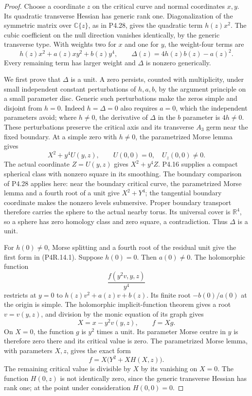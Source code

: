 \begin{proof}
Choose a coordinate $z$ on the critical curve and normal
coordinates $x,y$. Its quadratic transverse Hessian has generic
rank one. Diagonalization of the symmetric matrix over
$\mathbb C\{z\}$, as in P4.28, gives the quadratic term
$h(z)x^2$. The cubic coefficient on the null direction
vanishes identically, by the generic transverse type. With
weights two for $x$ and one for $y$, the weight-four terms are
\[
 h(z)x^2+a(z)xy^2+b(z)y^4,\qquad
 \Delta(z)=4h(z)b(z)-a(z)^2.                             \tag{P4R.14.2}
\]
Every remaining term has larger weight and $\Delta$ is
nonzero generically.

We first prove that $\Delta$ is a unit. A zero persists,
counted with multiplicity, under small independent constant
perturbations of $h,a,b$, by the argument principle on a
small parameter disc. Generic such perturbations make the
zeros simple and disjoint from $h=0$. Indeed $h=\Delta=0$
also requires $a=0$, which the independent parameters avoid;
where $h\ne0$, the derivative of $\Delta$ in the $b$
parameter is $4h\ne0$. These perturbations preserve the
critical axis and its transverse $A_3$ germ near the fixed
boundary. At a simple zero with $h\ne0$, the parametrized
Morse lemma gives
\[
 X^2+y^4U(y,z),\qquad U(0,0)=0,\quad U_z(0,0)\ne0.
\]
The actual coordinate $Z=U(y,z)$ gives $X^2+y^4Z$.
P4.16 supplies a compact spherical class with nonzero square
in its smoothing. The boundary comparison of P4.28 applies
here: near the boundary critical curve, the parametrized
Morse lemma and a fourth root of a unit give $X^2+Y^4$;
the tangential boundary coordinate makes the nonzero levels
submersive. Proper boundary transport therefore carries the
sphere to the actual nearby torus. Its universal cover is
$\mathbb R^4$, so a sphere has zero homology class and zero
square, a contradiction. Thus $\Delta$ is a unit.

For $h(0)\ne0$, Morse splitting and a fourth root of the
residual unit give the first form in (P4R.14.1). Suppose
$h(0)=0$. Then $a(0)\ne0$. The holomorphic function
\[
 \frac{f(y^2v,y,z)}{y^4}
\]
restricts at $y=0$ to $h(z)v^2+a(z)v+b(z)$. Its finite
root $-b(0)/a(0)$ at the origin is simple. The holomorphic
implicit-function theorem gives a root $v=v(y,z)$, and
division by the monic equation of its graph gives
\[
 X=x-y^2v(y,z),\qquad f=Xg.
\]
On $X=0$, the function $g$ is $y^2$ times a unit. Its
parameter Morse centre in $y$ is therefore zero there and
its critical value is zero. The parametrized Morse lemma,
with parameters $X,z$, gives the exact form
\[
 f=X\bigl(Y^2+XH(X,z)\bigr).                            \tag{P4R.14.3}
\]
The remaining critical value is divisible by $X$ by its
vanishing on $X=0$. The function $H(0,z)$ is not identically
zero, since the generic transverse Hessian has rank one;
at the point under consideration $H(0,0)=0$.


\end{proof}
